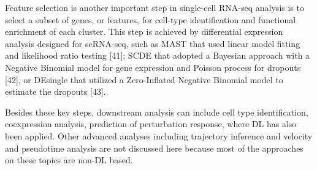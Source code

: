 \documentclass[
]{book}
\begin{document}
Feature selection is another important step in single-cell RNA-seq analysis is to select a subset of genes, or features, for cell-type identification and functional enrichment of each cluster. This step is achieved by differential expression analysis designed for scRNA-seq, such as MAST that used linear model fitting and likelihood ratio testing {[}41{]}; SCDE that adopted a Bayesian approach with a Negative Binomial model for gene expression and Poisson process for dropouts {[}42{]}, or DEsingle that utilized a Zero-Inflated Negative Binomial model to estimate the dropouts {[}43{]}.

Besides these key steps, downstream analysis can include cell type identification, coexpression analysis, prediction of perturbation response, where DL has also been applied. Other advanced analyses including trajectory inference and velocity and pseudotime analysis are not discussed here because most of the approaches on these topics are non-DL based.

  
\end{document}
